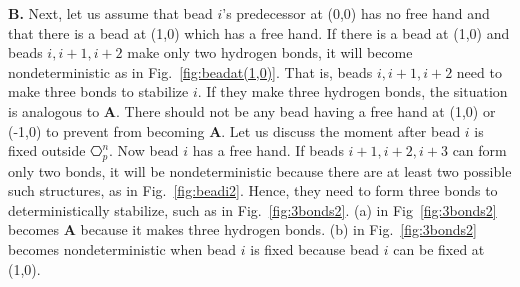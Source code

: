 \textbf{B.} Next, let us assume that bead $i$'s predecessor at (0,0) has no free hand and that there is a bead at (1,0) which has a free hand. If there is a bead at (1,0) and beads $i, i+1, i+2$ make only two hydrogen bonds, it will become nondeterministic as in Fig.~\ref{fig:beadat(1,0)}. That is, beads $i, i+1, i+2$ need to make three bonds to stabilize $i$. If they make three hydrogen bonds, the situation is analogous to \textbf{A}. There should not be any bead having a free hand at (1,0) or (-1,0) to prevent from becoming \textbf{A}. Let us discuss the moment after bead $i$ is fixed outside $\hexagon_p^n$. Now bead $i$ has a free hand. If beads $i+1, i+2, i+3$ can form only two bonds, it will be nondeterministic because there are at least two possible such structures, as in Fig.~\ref{fig:beadi2}. Hence, they need to form three bonds to deterministically stabilize, such as in Fig.~\ref{fig:3bonds2}. (a) in Fig~\ref{fig:3bonds2} becomes \textbf{A} because it makes three hydrogen bonds. (b) in Fig.~\ref{fig:3bonds2} becomes nondeterministic when bead $i$ is fixed because bead $i$ can be fixed at (1,0).\\



